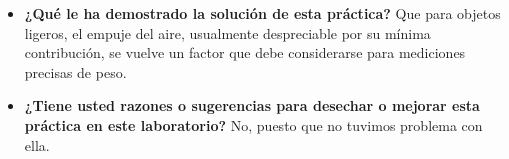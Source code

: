 \documentclass[12pt]{article}
\begin{document}
\begin{itemize}
\begin{center}
        $m_{U}>m_{P}$
    \end{center}
    Es decir, cuando se use la campana de vacío y desaparezca el empuje, la balanza se inclinará hacia el lado de la bolita de unicel.
    
    \item \textbf{¿Qué le ha demostrado la solución de esta práctica?}
    Que para objetos ligeros, el empuje del aire, usualmente despreciable por su mínima contribución, se vuelve un factor que debe considerarse para mediciones precisas de peso.
    
    \item \textbf{¿Tiene usted razones o sugerencias para desechar o mejorar esta práctica en este laboratorio?} 
    No, puesto que no tuvimos problema con ella.
\end{itemize}


\end{document}
